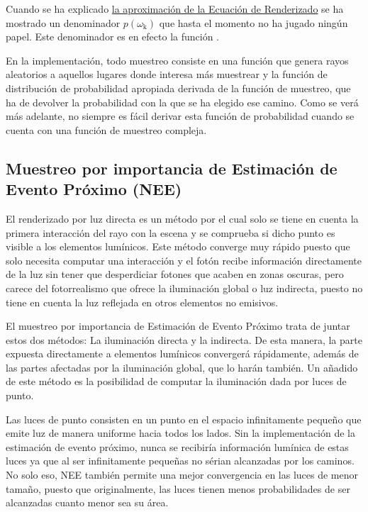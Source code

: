 Cuando se ha explicado \hyperref[subsec:montecarlo]{la aproximación de la Ecuación de Renderizado} se ha mostrado un denominador $p(\omega _{\text{k}})$ que hasta el momento no ha jugado ningún papel. Este denominador es en efecto la función .

En la implementación, todo muestreo consiste en una función que genera rayos aleatorios a aquellos lugares donde interesa más muestrear  y la función de distribución de probabilidad apropiada  derivada de la función de muestreo, que ha de devolver la probabilidad con la que se ha elegido ese camino. Como se verá más adelante, no siempre es fácil derivar esta función de probabilidad cuando se cuenta con una función de muestreo compleja.


\subsection{Muestreo por importancia de Estimación de Evento Próximo (NEE)}
\label{sub:nee}

El renderizado por luz directa es un método por el cual solo se tiene en cuenta la primera interacción del rayo con la escena y se comprueba si dicho punto es visible a los elementos lumínicos. Este método converge muy rápido puesto que solo necesita computar una interacción y el fotón recibe información directamente de la luz sin tener que desperdiciar fotones que acaben en zonas oscuras, pero carece del fotorrealismo que ofrece la iluminación global o luz indirecta, puesto no tiene en cuenta la luz reflejada en otros elementos no emisivos.

El muestreo por importancia de Estimación de Evento Próximo trata de juntar estos dos métodos: La iluminación directa y la indirecta. De esta manera, la parte expuesta directamente a elementos lumínicos convergerá rápidamente, además de las partes afectadas por la iluminación global, que lo harán también. Un añadido de este método es la posibilidad de computar la iluminación dada por luces de punto.

Las luces de punto consisten en un punto en el espacio infinitamente pequeño que emite luz de manera uniforme hacia todos los lados. Sin la implementación de la estimación de evento próximo, nunca se recibiría información lumínica de estas luces ya que al ser infinitamente pequeñas no sérian alcanzadas por los caminos. No solo eso, NEE también permite una mejor convergencia en las luces de menor tamaño, puesto que originalmente, las luces tienen menos probabilidades de ser alcanzadas cuanto menor sea su área.

